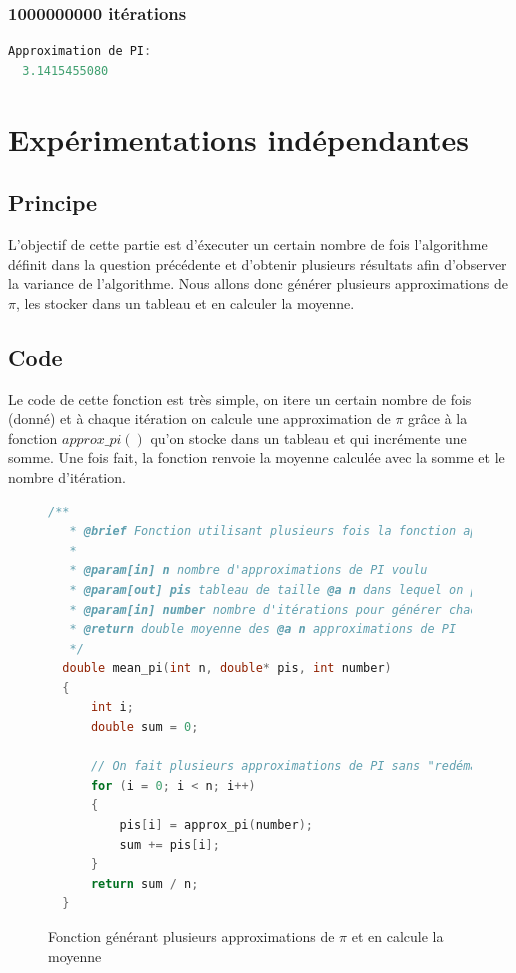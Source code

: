 \documentclass{article}
\begin{document}
\subsubsection{1000000000 itérations}
\begin{lstlisting}[language=c++]
  Approximation de PI:
  3.1415455080
\end{lstlisting}



\section{Expérimentations indépendantes}
\subsection{Principe}
L'objectif de cette partie est d'éxecuter un certain nombre de fois l'algorithme définit dans la
question précédente et d'obtenir plusieurs résultats afin d'observer la variance de l'algorithme.
Nous allons donc générer plusieurs approximations de $\pi$, les stocker dans un tableau et en
calculer la moyenne.

\subsection{Code}
Le code de cette fonction est très simple, on itere un certain nombre de fois (donné) et à chaque
itération on calcule une approximation de $\pi$ grâce à la fonction \emph{$approx\_pi()$} qu'on stocke
dans un tableau et qui incrémente une somme. Une fois fait, la fonction renvoie la moyenne calculée avec
la somme et le nombre d'itération.

\newpage
\begin{figure}
\caption{Fonction générant plusieurs approximations de $\pi$ et en calcule la moyenne}
\begin{lstlisting}[language=c++]
  /**
   * @brief Fonction utilisant plusieurs fois la fonction approx_pi() afin d'en faire une moyenne
   * 
   * @param[in] n nombre d'approximations de PI voulu
   * @param[out] pis tableau de taille @a n dans lequel on place les approximations de PI générées
   * @param[in] number nombre d'itérations pour générer chaque approximation avec la fonction approx_pi()
   * @return double moyenne des @a n approximations de PI
   */
  double mean_pi(int n, double* pis, int number)
  {
      int i;
      double sum = 0;
  
      // On fait plusieurs approximations de PI sans "redémarrer" le générateur de nombres aléatoires
      for (i = 0; i < n; i++)
      {
          pis[i] = approx_pi(number);
          sum += pis[i];
      }
      return sum / n;
  }
\end{lstlisting}
\end{figure}
\end{document}
